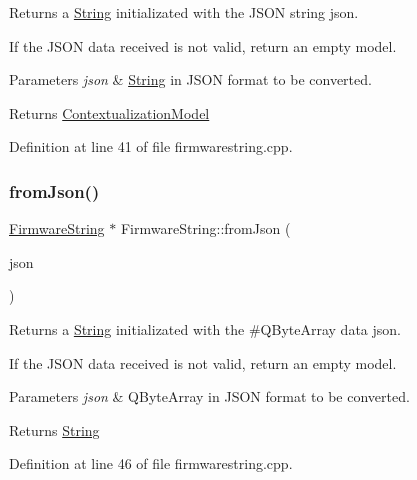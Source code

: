 Returns a \mbox{\hyperlink{classString}{String}} initializated with the J\+S\+ON string json. 

If the J\+S\+ON data received is not valid, return an empty model. 
\begin{DoxyParams}{Parameters}
{\em json} & \mbox{\hyperlink{classString}{String}} in J\+S\+ON format to be converted. \\
\hline
\end{DoxyParams}
\begin{DoxyReturn}{Returns}
\mbox{\hyperlink{classContextualizationModel}{Contextualization\+Model}} 
\end{DoxyReturn}


Definition at line 41 of file firmwarestring.\+cpp.

\mbox{\label{classFirmwareString_a90a6e343748d41c0a0ab9eb7e4fccaee}} 
\subsubsection{\texorpdfstring{from\+Json()}{fromJson()}\hspace{0.1cm}{\footnotesize\ttfamily [2/2]}}
{\footnotesize\ttfamily \mbox{\hyperlink{classFirmwareString}{Firmware\+String}} $\ast$ Firmware\+String\+::from\+Json (\begin{DoxyParamCaption}\item[{Q\+Byte\+Array \&}]{json }\end{DoxyParamCaption})\hspace{0.3cm}{\ttfamily [static]}}



Returns a \mbox{\hyperlink{classString}{String}} initializated with the \#\+Q\+Byte\+Array data json. 

If the J\+S\+ON data received is not valid, return an empty model. 
\begin{DoxyParams}{Parameters}
{\em json} & Q\+Byte\+Array in J\+S\+ON format to be converted. \\
\hline
\end{DoxyParams}
\begin{DoxyReturn}{Returns}
\mbox{\hyperlink{classString}{String}} 
\end{DoxyReturn}


Definition at line 46 of file firmwarestring.\+cpp.

